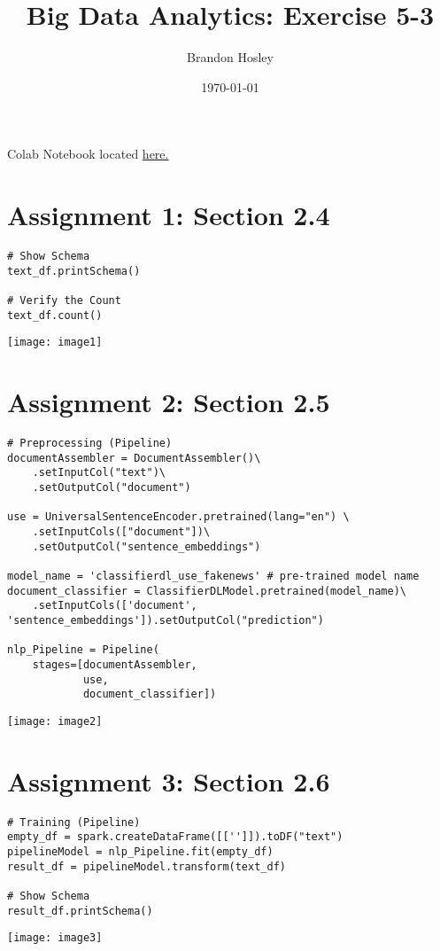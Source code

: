 \documentclass[]{article}
\title{Big Data Analytics: Exercise 5-3}
\author{Brandon Hosley}
\date{\today}
\begin{document}
\maketitle

\vspace{-1.5em}

Colab Notebook located
\href{https://colab.research.google.com/drive/1vNtxLyW-ZiW-fKm9A9IOu655ZulL9s1E?usp=sharing}{here.}

\vspace{-1.5em}

\section*{Assignment 1: Section 2.4}
\begin{verbatim}
# Show Schema
text_df.printSchema()

# Verify the Count
text_df.count()
\end{verbatim}
\texttt{[image: image1]}

\section*{Assignment 2: Section 2.5}

\begin{verbatim}
# Preprocessing (Pipeline)
documentAssembler = DocumentAssembler()\
	.setInputCol("text")\
	.setOutputCol("document")

use = UniversalSentenceEncoder.pretrained(lang="en") \
	.setInputCols(["document"])\
	.setOutputCol("sentence_embeddings")

model_name = 'classifierdl_use_fakenews' # pre-trained model name
document_classifier = ClassifierDLModel.pretrained(model_name)\
	.setInputCols(['document', 
'sentence_embeddings']).setOutputCol("prediction")

nlp_Pipeline = Pipeline(
	stages=[documentAssembler, 
			use,
			document_classifier])
\end{verbatim}
\texttt{[image: image2]} 


\section*{Assignment 3: Section 2.6}

\begin{verbatim}
# Training (Pipeline)
empty_df = spark.createDataFrame([['']]).toDF("text")
pipelineModel = nlp_Pipeline.fit(empty_df)
result_df = pipelineModel.transform(text_df)

# Show Schema
result_df.printSchema()
\end{verbatim}
\texttt{[image: image3]} 
\end{document}
